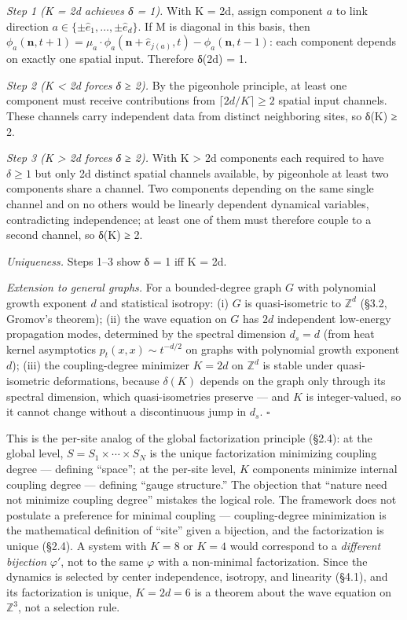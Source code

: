 \documentclass[
]{article}
\begin{document}
\emph{Step 1 (K = 2d achieves δ = 1).} With K = 2d, assign component
\(a\) to link direction
\(a \in \{\pm\hat{e}_1, \ldots, \pm\hat{e}_d\}\). If M is diagonal in
this basis, then
\(\phi_a(\mathbf{n}, t+1) = \mu_a \cdot \phi_a(\mathbf{n} + \hat{e}_{j(a)}, t) - \phi_a(\mathbf{n}, t-1)\):
each component depends on exactly one spatial input. Therefore δ(2d) =
1.

\emph{Step 2 (K \textless{} 2d forces δ ≥ 2).} By the pigeonhole
principle, at least one component must receive contributions from
\(\lceil 2d/K \rceil \geq 2\) spatial input channels. These channels
carry independent data from distinct neighboring sites, so δ(K) ≥ 2.

\emph{Step 3 (K \textgreater{} 2d forces δ ≥ 2).} With K \textgreater{}
2d components each required to have \(\delta \geq 1\) but only 2d
distinct spatial channels available, by pigeonhole at least two
components share a channel. Two components depending on the same single
channel and on no others would be linearly dependent dynamical
variables, contradicting independence; at least one of them must
therefore couple to a second channel, so δ(K) ≥ 2.

\emph{Uniqueness.} Steps 1--3 show δ = 1 iff K = 2d.

\emph{Extension to general graphs.} For a bounded-degree graph \(G\)
with polynomial growth exponent \(d\) and statistical isotropy: (i)
\(G\) is quasi-isometric to \(\mathbb{Z}^d\) (§3.2, Gromov's theorem);
(ii) the wave equation on \(G\) has \(2d\) independent low-energy
propagation modes, determined by the spectral dimension \(d_s = d\)
(from heat kernel asymptotics \(p_t(x,x) \sim t^{-d/2}\) on graphs with
polynomial growth exponent \(d\)); (iii) the coupling-degree minimizer
\(K = 2d\) on \(\mathbb{Z}^d\) is stable under quasi-isometric
deformations, because \(\delta(K)\) depends on the graph only through
its spectral dimension, which quasi-isometries preserve --- and \(K\) is
integer-valued, so it cannot change without a discontinuous jump in
\(d_s\). \(\square\)

This is the per-site analog of the global factorization principle
(§2.4): at the global level, \(S = S_1 \times \cdots \times S_N\) is the
unique factorization minimizing coupling degree --- defining ``space'';
at the per-site level, \(K\) components minimize internal coupling
degree --- defining ``gauge structure.'' The objection that ``nature
need not minimize coupling degree'' mistakes the logical role. The
framework does not postulate a preference for minimal coupling ---
coupling-degree minimization is the mathematical definition of ``site''
given a bijection, and the factorization is unique (§2.4). A system with
\(K = 8\) or \(K = 4\) would correspond to a \emph{different bijection}
\(\varphi'\), not to the same \(\varphi\) with a non-minimal
factorization. Since the dynamics is selected by center independence,
isotropy, and linearity (§4.1), and its factorization is unique,
\(K = 2d = 6\) is a theorem about the wave equation on \(\mathbb{Z}^3\),
not a selection rule.
\end{document}
